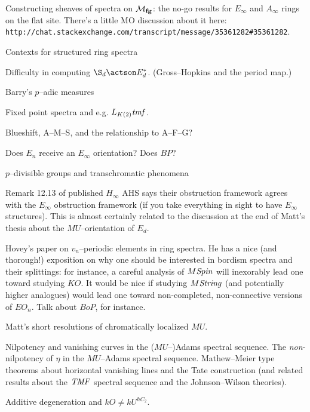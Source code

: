 Constructing sheaves of spectra on $\mathcal{M}_{\mathbf{fg}}$: the no-go results for $E_\infty$ and $A_\infty$ rings on the flat site.  There's a little MO discussion about it here: \texttt{http://chat.stackexchange.com/transcript/message/35361282\#35361282}.

Contexts for structured ring spectra

Difficulty in computing $\S_d \actson E_d^*$. (Gross--Hopkins and the period map.)

Barry's $p$--adic measures

Fixed point spectra and e.g. $L_{K(2)} \mathit{tmf}$.

Blueshift, A--M--S, and the relationship to A--F--G?

Does $E_n$ receive an $E_\infty$ orientation?  Does $BP$?

$p$--divisible groups and transchromatic phenomena

Remark 12.13 of published $H_\infty$ AHS says their obstruction framework agrees with the $E_\infty$ obstruction framework (if you take everything in sight to have $E_\infty$ structures).  This is almost certainly related to the discussion at the end of Matt's thesis about the $MU$--orientation of $E_d$.

Hovey's paper on $v_n$--periodic elements in ring spectra.  He has a nice (and thorough!) exposition on why one should be interested in bordism spectra and their splittings: for instance, a careful analysis of $M\mathit{Spin}$ will inexorably lead one toward studying $KO$.  It would be nice if studying $M\mathit{String}$ (and potentially higher analogues) would lead one toward non-completed, non-connective versions of $EO_n$.  Talk about $BoP$, for instance.

Matt's short resolutions of chromatically localized $MU$.

Nilpotency and vanishing curves in the ($MU$--)Adams spectral sequence.  The \emph{non}-nilpotency of $\eta$ in the $MU$--Adams spectral sequence.  Mathew--Meier type theorems about horizontal vanishing lines and the Tate construction (and related results about the $\mathit{TMF}$ spectral sequence and the Johnson--Wilson theories).

Additive degeneration and $kO \ne kU^{hC_2}$.






